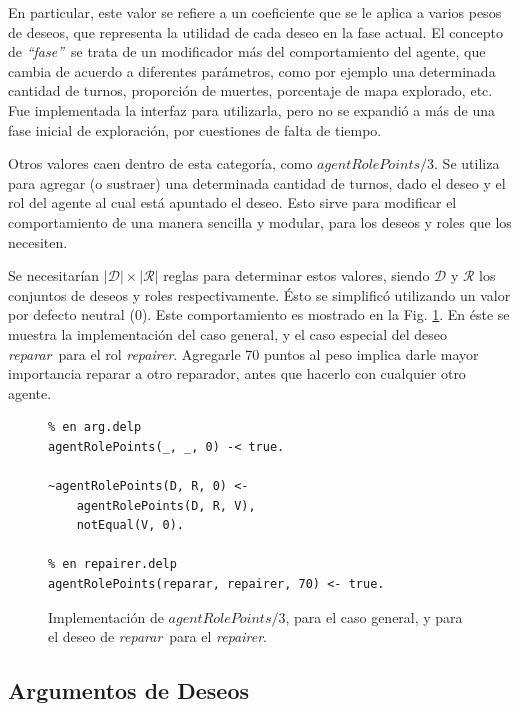 \documentclass[oneside]{book}
\theoremstyle{definition}
\newcommand{\lit}[1]{\mbox{$ #1$}}
\begin{document}
En particular, este valor se refiere a un coeficiente que se le aplica a varios
pesos de deseos, que representa la utilidad de cada deseo en la fase actual. El 
concepto de \textit{``fase''}\ se trata de un modificador más del comportamiento
del agente, que cambia de acuerdo a diferentes parámetros, como por ejemplo una
determinada cantidad de turnos, proporción de muertes, porcentaje de mapa explorado,
etc. Fue implementada la interfaz para utilizarla, pero no se expandió a más de una
fase inicial de exploración, por cuestiones de falta de tiempo.

Otros valores caen dentro de esta categoría, como \lit{agentRolePoints/3}.
Se utiliza para agregar (o sustraer) una determinada cantidad de turnos, dado el
deseo y el rol del agente al cual está apuntado el deseo. Esto sirve para modificar el 
comportamiento de una manera sencilla y modular, para los deseos y roles que los 
necesiten.

Se necesitarían $|{\mathcal D}| \times |{\mathcal R}|$ reglas para determinar 
estos valores, siendo $\mathcal D$ y $\mathcal R$ los conjuntos de deseos y 
roles respectivamente. Ésto se simplificó utilizando un valor por defecto 
neutral ($0$). Este comportamiento es mostrado en la Fig. 
\ref{fig:agentRolePoints}. En éste se muestra la implementación del caso 
general, y el caso especial del deseo \emph{reparar}\ para el rol 
\emph{repairer}. Agregarle 70 puntos al peso implica darle mayor importancia 
reparar a otro reparador, antes que hacerlo con cualquier otro agente.

\begin{figure}
\begin{verbatim}
% en arg.delp
agentRolePoints(_, _, 0) -< true.
	
~agentRolePoints(D, R, 0) <- 
	agentRolePoints(D, R, V),
	notEqual(V, 0).
    
% en repairer.delp
agentRolePoints(reparar, repairer, 70) <- true.
\end{verbatim}
\caption{Implementación de \lit{agentRolePoints/3}, para el caso general, y para el 
deseo de \emph{reparar}\ para el \emph{repairer}.}
\label{fig:agentRolePoints}
\end{figure}


\subsection{Argumentos de Deseos}

\label{sec:argumentosDeseos}
\end{document}
